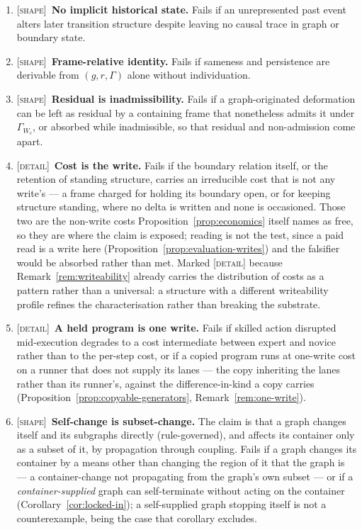 \documentclass[11pt,a4paper]{article}
\theoremstyle{remark}\newtheorem{remark}[definition]{Remark}
\begin{document}
\begin{enumerate}[leftmargin=*]
\item \textsc{[shape]}~\textbf{No implicit historical state.} Fails if an unrepresented past event alters later transition structure despite leaving no causal trace in graph or boundary state.
\item \textsc{[shape]}~\textbf{Frame-relative identity.} Fails if sameness and persistence are derivable from $(g,r,\Gamma)$ alone without individuation.
\item \textsc{[shape]}~\textbf{Residual is inadmissibility.} Fails if a graph-originated deformation can be left as residual by a containing frame that nonetheless admits it under $\Gamma_{W_c}$, or absorbed while inadmissible, so that residual and non-admission come apart.
\item \textsc{[detail]}~\textbf{Cost is the write.} Fails if the boundary relation itself, or the retention of standing structure, carries an irreducible cost that is not any write's --- a frame charged for holding its boundary open, or for keeping structure standing, where no delta is written and none is occasioned. Those two are the non-write costs Proposition~\ref{prop:economics} itself names as free, so they are where the claim is exposed; reading is not the test, since a paid read is a write here (Proposition~\ref{prop:evaluation-writes}) and the falsifier would be absorbed rather than met. Marked \textsc{[detail]} because Remark~\ref{rem:writeability} already carries the distribution of costs as a pattern rather than a universal: a structure with a different writeability profile refines the characterisation rather than breaking the substrate.
\item \textsc{[detail]}~\textbf{A held program is one write.} Fails if skilled action disrupted mid-execution degrades to a cost intermediate between expert and novice rather than to the per-step cost, or if a copied program runs at one-write cost on a runner that does not supply its lanes --- the copy inheriting the lanes rather than its runner's, against the difference-in-kind a copy carries (Proposition~\ref{prop:copyable-generators}, Remark~\ref{rem:one-write}).
\item \textsc{[shape]}~\textbf{Self-change is subset-change.} The claim is that a graph changes itself and its subgraphs directly (rule-governed), and affects its container only as a subset of it, by propagation through coupling. Fails if a graph changes its container by a means other than changing the region of it that the graph is --- a container-change not propagating from the graph's own subset --- or if a \emph{container-supplied} graph can self-terminate without acting on the container (Corollary~\ref{cor:locked-in}); a self-supplied graph stopping itself is not a counterexample, being the case that corollary excludes.

\end{enumerate}
\end{document}
